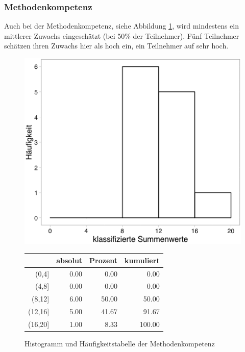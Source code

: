 \documentclass[12pt,smallheadings, bibliography=totoc]{scrartcl}
\begin{document}
\subsubsection{Methodenkompetenz}\label{methodenkompetenz}

Auch bei der Methodenkompetenz, siehe Abbildung \ref{fig:MK}, wird
mindestens ein mittlerer Zuwachs eingeschätzt (bei 50\% der Teilnehmer).
Fünf Teilnehmer schätzen ihren Zuwachs hier als hoch ein, ein Teilnehmer
auf sehr hoch.

\begin{figure}[H]
\begin{minipage}{.4\linewidth}
\includegraphics[width=0.8\linewidth]{Anhang/MKHistnn.png}


\end{minipage}
\begin{minipage}{.4\linewidth}
\centering
\raisebox{\depth}
{\begin{tabular}{rrrr}
  \hline
 & absolut & Prozent & kumuliert \\ 
  \hline
(0,4] & 0.00 & 0.00 & 0.00 \\ 
  (4,8] & 0.00 & 0.00 & 0.00 \\ 
  (8,12] & 6.00 & 50.00 & 50.00 \\ 
  (12,16] & 5.00 & 41.67 & 91.67 \\ 
  (16,20] & 1.00 & 8.33 & 100.00 \\ 
   \hline
\end{tabular}

}
\label{tab:defis}
\end{minipage}
\caption{Histogramm und Häufigkeitstabelle der Methodenkompetenz}
\label{fig:MK}
\end{figure}
\end{document}
